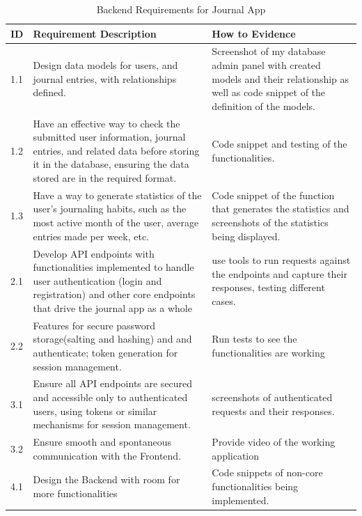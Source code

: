 \begin{table}[H]
\centering
\begin{tabular}{|l|p{8cm}|p{4cm}|}  
\hline
\textbf{ID} & \textbf{Requirement Description}& \textbf{How to Evidence} \\ \hline
1.1 & Design data models for users, and journal entries, with relationships defined. & Screenshot of my database admin panel with created models and their relationship as well as code snippet of the definition of the models. \\ \hline

1.2 & Have an effective way to check the submitted user information, journal entries, and related data before storing it in the database, ensuring the data stored are in the required format. & Code snippet and testing of the functionalities. \\ \hline

1.3 & Have a way to generate statistics of the user's journaling habits, such as the most active month of the user, average entries made per week, etc. & Code snippet of the function that generates the statistics and screenshots of the statistics being displayed. \\ \hline

2.1 & Develop API endpoints with functionalities implemented to handle user authentication (login and registration) and other core endpoints that drive the journal app as a whole & use tools to run requests against the endpoints and capture their responses, testing different cases.\\ \hline

2.2 & Features for secure password storage(salting and hashing) and and authenticate; token generation for session management.& Run tests to see the functionalities are working\\ \hline

3.1 & Ensure all API endpoints are secured and accessible only to authenticated users, using tokens or similar mechanisms for session management.& screenshots of authenticated requests and their responses. \\ \hline

3.2 & Ensure smooth and spontaneous communication with the Frontend. & Provide video of the working application \\ \hline
4.1 & Design the Backend with room for more functionalities & Code snippets of non-core functionalities being implemented. \\ \hline

\end{tabular}
\caption{Backend Requirements for Journal App}
\end{table}

